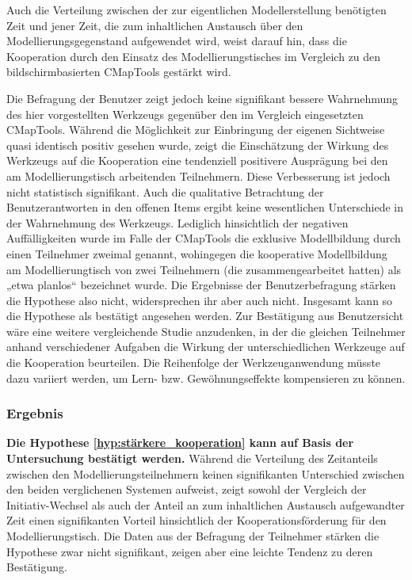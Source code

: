 Auch die Verteilung zwischen der zur eigentlichen Modellerstellung benötigten Zeit und jener Zeit, die zum inhaltlichen Austausch über den Modellierungsgegenstand aufgewendet wird, weist darauf hin, dass die Kooperation durch den Einsatz des Modellierungstisches im Vergleich zu den bildschirmbasierten CMapTools gestärkt wird.

Die Befragung der Benutzer zeigt jedoch keine signifikant bessere Wahrnehmung des hier vorgestellten Werkzeugs gegenüber den im Vergleich eingesetzten CMapTools. Während die Möglichkeit zur Einbringung der eigenen Sichtweise quasi identisch positiv gesehen wurde, zeigt die Einschätzung der Wirkung des Werkzeugs auf die Kooperation eine tendenziell positivere Ausprägung bei den am Modellierungstisch arbeitenden Teilnehmern. Diese Verbesserung ist jedoch nicht statistisch signifikant. Auch die qualitative Betrachtung der Benutzerantworten in den offenen Items ergibt keine wesentlichen Unterschiede in der Wahrnehmung des Werkzeugs. Lediglich hinsichtlich der negativen Auffälligkeiten wurde im Falle der CMapTools die exklusive Modellbildung durch einen Teilnehmer zweimal genannt, wohingegen die kooperative Modellbildung am Modellierungtisch von zwei Teilnehmern (die zusammengearbeitet hatten) als „etwa planlos“ bezeichnet wurde. Die Ergebnisse der Benutzerbefragung stärken die Hypothese also nicht, widersprechen ihr aber auch nicht. Insgesamt kann so die Hypothese als bestätigt angesehen werden. Zur Bestätigung aus Benutzersicht wäre eine weitere vergleichende Studie anzudenken, in der die gleichen Teilnehmer anhand verschiedener Aufgaben die Wirkung der unterschiedlichen Werkzeuge auf die Kooperation beurteilen. Die Reihenfolge der Werkzeuganwendung müsste dazu variiert werden, um Lern- bzw. Gewöhnungseffekte kompensieren zu können.

\subsubsection{Ergebnis} %

\textbf{Die Hypothese \ref{hyp:stärkere_kooperation} kann auf Basis der Untersuchung bestätigt werden.} Während die Verteilung des Zeitanteils zwischen den Modellierungsteilnehmern keinen signifikanten Unterschied zwischen den beiden verglichenen Systemen aufweist, zeigt sowohl der Vergleich der Initiativ-Wechsel als auch der Anteil an zum inhaltlichen Austausch aufgewandter Zeit einen signifikanten Vorteil hinsichtlich der Kooperationsförderung für den Modellierungstisch. Die Daten aus der Befragung der Teilnehmer stärken die Hypothese zwar nicht signifikant, zeigen aber eine leichte Tendenz zu deren Bestätigung. 

